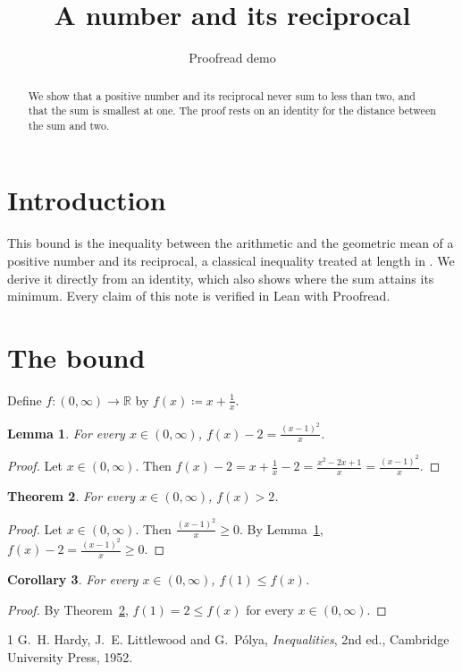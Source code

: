 \documentclass{article}
\title{A number and its reciprocal}
\author{Proofread demo}
\date{}
\newtheorem{lemma}{Lemma}
\newtheorem{theorem}[lemma]{Theorem}
\newtheorem{corollary}[lemma]{Corollary}
\begin{document}
\maketitle

\begin{abstract}
We show that a positive number and its reciprocal never sum to less than two, and that the sum is smallest at one.
The proof rests on an identity for the distance between the sum and two.
\end{abstract}

\section{Introduction}

This bound is the inequality between the arithmetic and the geometric mean of a positive number and its reciprocal, a classical inequality treated at length in \cite{hardy1952inequalities}.
We derive it directly from an identity, which also shows where the sum attains its minimum.
Every claim of this note is verified in Lean with Proofread.

\section{The bound}

Define $f:(0,\infty)\to\mathbb{R}$ by $f(x)\coloneqq x+\frac1x$.

\begin{lemma}\label{lem:identity}
For every $x\in(0,\infty)$, $f(x)-2=\frac{(x-1)^2}{x}$.
\end{lemma}

\begin{proof}
Let $x\in(0,\infty)$.
Then $f(x)-2=x+\frac1x-2=\frac{x^2-2x+1}{x}=\frac{(x-1)^2}{x}$.
\end{proof}

\begin{theorem}\label{thm:bound}
For every $x\in(0,\infty)$, $f(x)>2$.
\end{theorem}

\begin{proof}
Let $x\in(0,\infty)$.
Then $\frac{(x-1)^2}{x}\ge0$.
By Lemma~\ref{lem:identity}, $f(x)-2=\frac{(x-1)^2}{x}\ge0$.
\end{proof}

\begin{corollary}\label{cor:min}
For every $x\in(0,\infty)$, $f(1)\le f(x)$.
\end{corollary}

\begin{proof}
By Theorem~\ref{thm:bound}, $f(1)=2\le f(x)$ for every $x\in(0,\infty)$.
\end{proof}

\begin{thebibliography}{1}
 G.~H. Hardy, J.~E. Littlewood and G.~P\'olya, \emph{Inequalities}, 2nd ed., Cambridge University Press, 1952.
\end{thebibliography}
\end{document}
